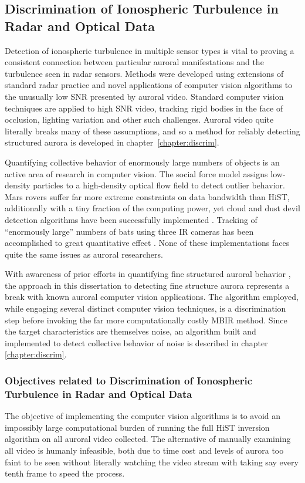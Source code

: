 \FloatBarrier
\subsection{Discrimination of Ionospheric Turbulence in Radar and Optical Data}\label{sec:intdiscrim}
Detection of ionospheric turbulence in multiple sensor types is vital to proving a consistent connection between particular auroral manifestations and the turbulence seen in radar sensors.
Methods were developed using extensions of standard radar practice and novel applications of computer vision algorithms to the unusually low SNR presented by auroral video.
Standard computer vision techniques are applied to high SNR video, tracking rigid bodies in the face of occlusion, lighting variation and other such challenges.
Auroral video quite literally breaks many of these assumptions, and so a method for reliably detecting structured aurora is developed in chapter~\ref{chapter:discrim}.

Quantifying collective behavior of enormously large numbers of objects is an active area of research in computer vision.
The social force model \citep{mehran2009} assigns low-density particles to a high-density optical flow field to detect outlier behavior.
Mars rovers suffer far more extreme constraints on data bandwidth than HiST, additionally with a tiny fraction of the computing power, yet cloud and dust devil detection algorithms have been successfully implemented \citep{castano2008}.
Tracking of ``enormously large'' numbers of bats using three IR cameras has been accomplished to great quantitative effect \citep{betke2007,betke2008}.
None of these implementations faces quite the same issues as auroral researchers.

With awareness of prior efforts in quantifying fine structured auroral behavior \citep{semeter2006}, the approach in this dissertation to detecting fine structure aurora represents a break with known auroral computer vision applications.
The algorithm employed, while engaging several distinct computer vision techniques, is a discrimination step before invoking the far more computationally costly MBIR method.
Since the target characteristics are themselves noise, an algorithm built and implemented to detect collective behavior of noise is described in chapter \ref{chapter:discrim}.

\subsubsection{Objectives related to Discrimination of Ionospheric Turbulence in Radar and Optical Data}

The objective of implementing the computer vision algorithms is to avoid an impossibly large computational burden of running the full HiST inversion algorithm on all auroral video collected.
The alternative of manually examining all video is humanly infeasible, both due to time cost and levels of aurora too faint to be seen without literally watching the video stream with taking say every tenth frame to speed the process.
